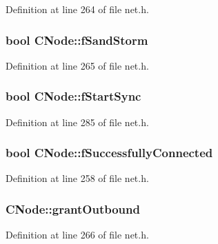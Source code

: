 Definition at line 264 of file net.\+h.

\hypertarget{class_c_node_aab66b45769e6c8009d224c63704a1859}{}
\subsubsection[{f\+Sand\+Storm}]{\setlength{\rightskip}{0pt plus 5cm}bool C\+Node\+::f\+Sand\+Storm}\label{class_c_node_aab66b45769e6c8009d224c63704a1859}


Definition at line 265 of file net.\+h.

\hypertarget{class_c_node_a4009c240ccb6d085ae57e8cf4d4c2cb6}{}
\subsubsection[{f\+Start\+Sync}]{\setlength{\rightskip}{0pt plus 5cm}bool C\+Node\+::f\+Start\+Sync}\label{class_c_node_a4009c240ccb6d085ae57e8cf4d4c2cb6}


Definition at line 285 of file net.\+h.

\hypertarget{class_c_node_ab58c1772b2698e348d86002f34254119}{}
\subsubsection[{f\+Successfully\+Connected}]{\setlength{\rightskip}{0pt plus 5cm}bool C\+Node\+::f\+Successfully\+Connected}\label{class_c_node_ab58c1772b2698e348d86002f34254119}


Definition at line 258 of file net.\+h.

\hypertarget{class_c_node_a4bb25f8bdeeaff5e8cb08abc97bbc44d}{}
\subsubsection[{grant\+Outbound}]{ C\+Node\+::grant\+Outbound}\label{class_c_node_a4bb25f8bdeeaff5e8cb08abc97bbc44d}


Definition at line 266 of file net.\+h.

